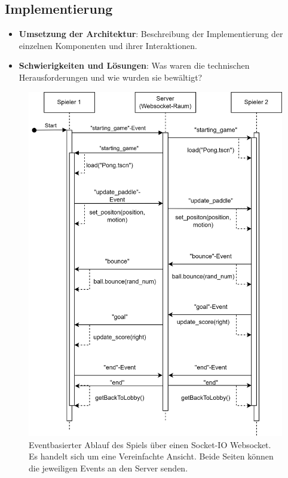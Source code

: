 \documentclass[
]{article}
\begin{document}
\subsection{Implementierung}
\begin{itemize}
    \item \textbf{Umsetzung der Architektur}: Beschreibung der Implementierung der einzelnen Komponenten und ihrer Interaktionen.
    \item \textbf{Schwierigkeiten und Lösungen}: Was waren die technischen Herausforderungen und wie wurden sie bewältigt?
\end{itemize}
\begin{figure}[H]
	\centering
	\includegraphics[width=\textwidth ]{resources/Event-Based-Spielablauf.png}
	\caption{Eventbasierter Ablauf des Spiels über einen Socket-IO Websocket. Es handelt sich um eine Vereinfachte Ansicht. Beide Seiten können die jeweiligen Events an den Server senden.}
	\label{fig:ablaufdiagramm-spiel}
\end{figure}
\end{document}
